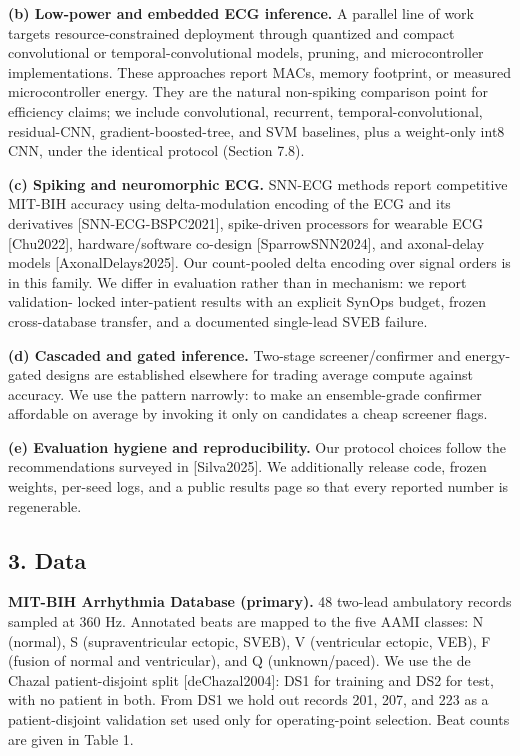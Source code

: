 \documentclass[
]{article}
\begin{document}
\textbf{(b) Low-power and embedded ECG inference.} A parallel line of
work targets resource-constrained deployment through quantized and
compact convolutional or temporal-convolutional models, pruning, and
microcontroller implementations. These approaches report MACs, memory
footprint, or measured microcontroller energy. They are the natural
non-spiking comparison point for efficiency claims; we include
convolutional, recurrent, temporal-convolutional, residual-CNN,
gradient-boosted-tree, and SVM baselines, plus a weight-only int8 CNN,
under the identical protocol (Section 7.8).

\textbf{(c) Spiking and neuromorphic ECG.} SNN-ECG methods report
competitive MIT-BIH accuracy using delta-modulation encoding of the ECG
and its derivatives {[}SNN-ECG-BSPC2021{]}, spike-driven processors for
wearable ECG {[}Chu2022{]}, hardware/software co-design
{[}SparrowSNN2024{]}, and axonal-delay models {[}AxonalDelays2025{]}.
Our count-pooled delta encoding over signal orders is in this family. We
differ in evaluation rather than in mechanism: we report validation-
locked inter-patient results with an explicit SynOps budget, frozen
cross-database transfer, and a documented single-lead SVEB failure.

\textbf{(d) Cascaded and gated inference.} Two-stage screener/confirmer
and energy-gated designs are established elsewhere for trading average
compute against accuracy. We use the pattern narrowly: to make an
ensemble-grade confirmer affordable on average by invoking it only on
candidates a cheap screener flags.

\textbf{(e) Evaluation hygiene and reproducibility.} Our protocol
choices follow the recommendations surveyed in {[}Silva2025{]}. We
additionally release code, frozen weights, per-seed logs, and a public
results page so that every reported number is regenerable.

\subsection{3. Data}\label{data}

\textbf{MIT-BIH Arrhythmia Database (primary).} 48 two-lead ambulatory
records sampled at 360 Hz. Annotated beats are mapped to the five AAMI
classes: N (normal), S (supraventricular ectopic, SVEB), V (ventricular
ectopic, VEB), F (fusion of normal and ventricular), and Q
(unknown/paced). We use the de Chazal patient-disjoint split
{[}deChazal2004{]}: DS1 for training and DS2 for test, with no patient
in both. From DS1 we hold out records 201, 207, and 223 as a
patient-disjoint validation set used only for operating-point selection.
Beat counts are given in Table 1.
\end{document}
